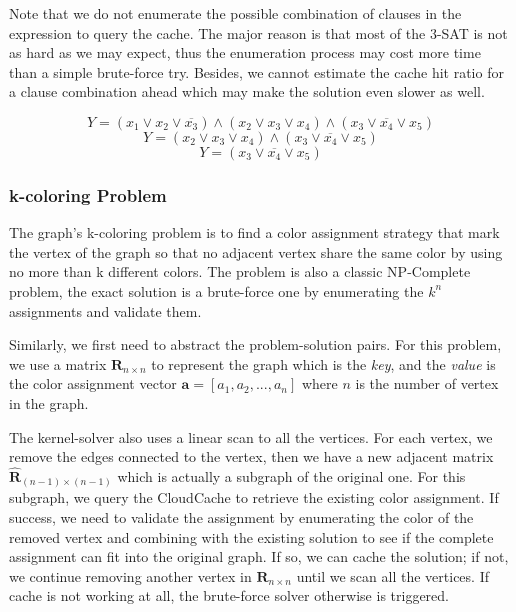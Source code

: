 Note that we do not enumerate the possible combination of clauses in the expression to query the cache. The major reason is that most of the 3-SAT is not as hard as we may expect, thus the enumeration process may cost more time than a simple brute-force try. Besides, we cannot estimate the cache hit ratio for a clause combination ahead which may make the solution even slower as well.

\begin{equation}
Y = (x_1 \vee x_2 \vee \overline{x_3}) \wedge (x_2 \vee x_3 \vee x_4) \wedge (x_3 \vee \overline{x_4} \vee x_5)
\label{eq:3-sat1}
\end{equation}
\begin{equation}
Y = (x_2 \vee x_3 \vee x_4) \wedge (x_3 \vee \overline{x_4} \vee x_5)
\label{eq:3-sat2}
\end{equation}
\begin{equation}
Y = (x_3 \vee \overline{x_4} \vee x_5)
\label{eq:3-sat3}
\end{equation}


\subsubsection{k-coloring Problem}
The graph's k-coloring problem is to find a color assignment strategy that mark the vertex of the graph so that no adjacent vertex share the same color by using no more than k different colors. The problem is also a classic NP-Complete problem, the exact solution is a brute-force one by enumerating the $k^n$ assignments and validate them.

Similarly, we first need to abstract the problem-solution pairs. For this problem, we use a matrix $\mathbf{R}_{n\times n}$ to represent the graph which is the \emph{key}, and the \emph{value} is the color assignment vector $\mathbf{a} = [a_1, a_2, ..., a_n]$ where $n$ is the number of vertex in the graph.

The kernel-solver also uses a linear scan to all the vertices. For each vertex, we remove the edges connected to the vertex, then we have a new adjacent matrix $\hat{\mathbf{R}}_{(n-1)\times (n-1)}$ which is actually a subgraph of the original one. For this subgraph, we query the CloudCache to retrieve the existing color assignment. If success, we need to validate the assignment by enumerating the color of the removed vertex and combining with the existing solution to see if the complete assignment can fit into the original graph. If so, we can cache the solution; if not, we continue removing another vertex in $\mathbf{R}_{n\times n}$ until we scan all the vertices. If cache is not working at all, the brute-force solver otherwise is triggered. 
